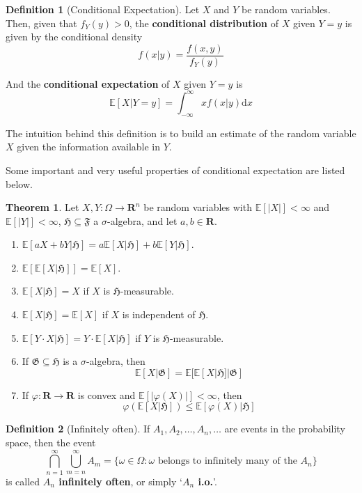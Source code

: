 \documentclass[12pt,a4paper]{article}
\theoremstyle{definition}
\newtheorem{theorem}{Theorem}[section]
\newtheorem{definition}{Definition}[section]
\begin{document}
\begin{definition}[Conditional Expectation]
	Let $X$ and $Y$ be random variables. Then, given that $f_Y(y) > 0$, the \textbf{conditional distribution} of $X$ given $Y=y$ is given by the conditional density
	\[
		f(x|y) = \frac{f(x,y)}{f_Y(y)}
	\]
	
	And the \textbf{conditional expectation} of $X$ given $Y=y$ is
	\[
		\mathbb{E} [X| Y = y] = \int_{-\infty}^\infty x f(x|y) \mathrm{d}x
	\]
\end{definition}

The intuition behind this definition is to build an estimate of the random variable $X$ given the information available in $Y$.

Some important and very useful properties of conditional expectation are listed below.

\begin{theorem}
	Let $X, Y : \Omega \longrightarrow \textbf{R}^n$ be random variables with $\mathbb{E}[|X|] < \infty$ and $\mathbb{E}[|Y|] < \infty$, $\mathfrak{H} \subseteq \mathfrak{F}$ a $\sigma$-algebra, and let $a, b \in \textbf{R}$.
	\begin{enumerate}
		\item $\mathbb{E} [ a X + b Y | \mathfrak{H}] = a \mathbb{E} [X | \mathfrak{H}] + b \mathbb{E} [Y | \mathfrak{H}]$.
		\item $\mathbb{E} [ \mathbb{E} [X | \mathfrak{H}] ] = \mathbb{E} [X]$.
		\item $\mathbb{E} [X | \mathfrak{H}] = X$ if $X$ is $\mathfrak{H}$-measurable.
		\item $\mathbb{E} [X | \mathfrak{H}] = \mathbb{E} [X]$ if $X$ is independent of $\mathfrak{H}$.
		\item $\mathbb{E} [Y \cdot X | \mathfrak{H}] = Y \cdot \mathbb{E} [X | \mathfrak{H}]$ if $Y$ is $\mathfrak{H}$-measurable.
		\item If $\mathfrak{G} \subseteq \mathfrak{H}$ is a $\sigma$-algebra, then \[ \mathbb{E} [X | \mathfrak{G}] = \mathbb{E} [ \mathbb{E} [X | \mathfrak{H}] | \mathfrak{G}] \]
		\item If $\varphi : \textbf{R} \longrightarrow \textbf{R}$ is convex and $\mathbb{E} [ | \varphi (X) | ] < \infty$, then \[ \varphi (\mathbb{E} [X | \mathfrak{H}]) \leq \mathbb{E} [\varphi(X) | \mathfrak{H}] \]
	\end{enumerate}
\end{theorem}

\begin{definition}[Infinitely often]
If $A_1, A_2, \ldots, A_n, \ldots$ are events in the probability space, then the event
\[
	\bigcap_{n=1}^\infty \bigcup_{m=n}^\infty A_m = \{ \omega \in \Omega : \omega \text{ belongs to infinitely many of the } A_n \}
\]
is called \textbf{$A_n$ infinitely often}, or simply `\textbf{$A_n$ i.o.}'.
\end{definition}
\end{document}
